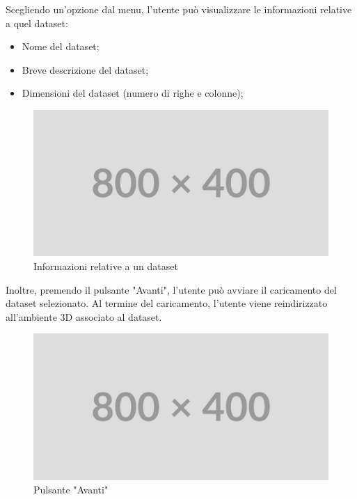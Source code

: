 Scegliendo un'opzione dal menu, l'utente può visualizzare le informazioni
relative a quel dataset:
\begin{itemize}
    \item Nome del dataset;
    \item Breve descrizione del dataset;
    \item Dimensioni del dataset (numero di righe e colonne);
\end{itemize}
\begin{figure}[ht!]
    \centering
    \includegraphics[scale=0.6]{template/images/placeholder.png}
    \caption{Informazioni relative a un dataset}
\end{figure}
Inoltre, premendo il pulsante "Avanti", l'utente può avviare il caricamento del
dataset selezionato. Al termine del caricamento, l'utente viene reindirizzato
all'ambiente 3D associato al dataset.
\begin{figure}[ht!]
    \centering
    \includegraphics[scale=0.6]{template/images/placeholder.png}
    \caption{Pulsante "Avanti"}
    \label{fig:avanti}
\end{figure}

